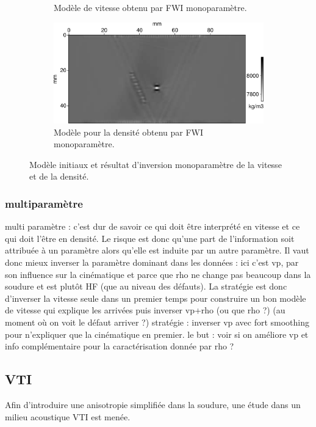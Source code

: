 \begin{figure}[!h]
\begin{subfigure}[b]{0.45\textwidth}
		\caption{Modèle de vitesse obtenu par FWI monoparamètre.}
	\end{subfigure}
	\begin{subfigure}[b]{0.45\textwidth}
		\includegraphics[width=\textwidth]{img/mono_param/rho_mono.png}
		\caption{Modèle pour la densité obtenu par FWI monoparamètre. }
	\end{subfigure}
	\caption{\label{app:inv_mono} Modèle initiaux et résultat d'inversion monoparamètre de la vitesse et de la densité.}
\end{figure}





\subsubsection{multiparamètre}



multi paramètre  : c'est dur de savoir ce qui doit être interprété en vitesse et ce qui doit l'être en densité. Le risque est donc qu'une part de l'information soit attribuée à un paramètre alors qu'elle est induite par un autre paramètre. Il vaut donc mieux inverser la paramètre dominant dans les données : ici c'est vp, par son influence sur la cinématique et parce que rho ne change pas beaucoup dans la soudure et est plutôt HF (que au niveau des défauts). La stratégie est donc d'inverser la vitesse seule dans un premier temps pour construire un bon modèle de vitesse qui explique les arrivées puis inverser vp+rho (ou que rho ?) (au moment où on voit le défaut arriver ?)
stratégie : inverser vp avec fort smoothing pour n'expliquer que la cinématique en premier.
le but : voir si on améliore vp et info complémentaire pour la caractérisation donnée par rho ?



\subsection{VTI}
Afin d'introduire une anisotropie simplifiée dans la soudure, une étude dans un milieu acoustique VTI est menée.\\

